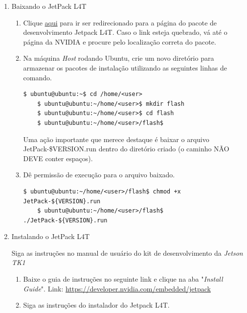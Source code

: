\begin{enumerate}
  \item Baixando o JetPack L4T
    \begin{enumerate}
      \item Clique \href{http://docs.nvidia.com/jetpack-l4t/index.html#developertools/mobile/jetpack/jetpack_l4t/2.1/jetpack_l4t_install.htm}{aqui} para ir ser redirecionado para a página do pacote de desenvolvimento Jetpack L4T. Caso o link esteja quebrado, vá até o página da NVIDIA e procure pelo localização correta do pacote.  

      \item Na máquina \textit{Host} rodando Ubuntu, crie um novo diretório para armazenar os pacotes de instalação utilizando as seguintes linhas de comando.

      \begin{lstlisting}[basicstyle=\tiny]
	$ ubuntu@ubuntu:~$ cd /home/<user>
	$ ubuntu@ubuntu:~/home/<user>$ mkdir flash
	$ ubuntu@ubuntu:~/home/<user>$ cd flash
	$ ubuntu@ubuntu:~/home/<user>/flash$ 
      \end{lstlisting}

      Uma ação importante que merece destaque é baixar o arquivo JetPack-\${VERSION}.run dentro do diretório criado (o caminho NÃO DEVE conter espaços).

      \item Dê permissão de execução para o arquivo baixado. 
      \begin{lstlisting}[basicstyle=\tiny]
	$ ubuntu@ubuntu:~/home/<user>/flash$ chmod +x JetPack-${VERSION}.run
	$ ubuntu@ubuntu:~/home/<user>/flash$ ./JetPack-${VERSION}.run
      \end{lstlisting}


    \end{enumerate}
  \item Instalando o JetPack L4T

    Siga as instruções no manual de usuário do kit de desenvolvimento da \textit{Jetson TK1}
    \begin{enumerate}
      \item Baixe o guia de instruções no seguinte link e clique na aba "\textit{Install Guide}". Link: \url{https://developer.nvidia.com/embedded/jetpack}
      \item Siga as instruções do instalador do Jetpack L4T.


\end{enumerate}
\end{enumerate}

